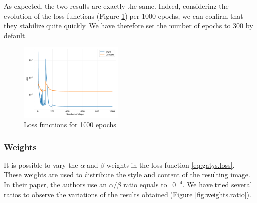 \documentclass[twocolumn,superscriptaddress,aps, floatfix]{revtex4-1}
\begin{document}
    As expected, the two results are exactly the same. Indeed, considering the evolution of the loss functions (Figure \ref{fig:number.steps.loss.functions}) per 1000 epochs, we can confirm that they stabilize quite quickly. We have therefore set the number of epochs to 300 by default.
    
    \begin{figure}[ht]
        \centering
        \includegraphics[width=0.45\textwidth]{resources/pdf/steps/sun-trees-paris-1000.pdf}
        \caption{Loss functions for 1000 epochs}
        \label{fig:number.steps.loss.functions}
    \end{figure}
    
    \subsubsection{Weights}
    
    It is possible to vary the $\alpha$ and $\beta$ weights in the loss function \eqref{eq:gatys.loss}. These weights are used to distribute the style and content of the resulting image. In their paper, the authors use an $\alpha/\beta$ ratio equals to $10^{-4}$. We have tried several ratios to observe the variations of the results obtained (Figure \ref{fig:weights.ratio}).
    
\end{document}
